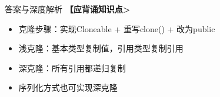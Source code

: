 \documentclass[12pt, a4paper]{ctexart}
\begin{document}
\begin{enumerate}[label=\textbf{\arabic*.}]
\begin{bluebox}{答案与深度解析}
		      \textbf{【应背诵知识点>}
		      \begin{itemize}[label={}, nosep]
			      \item 克隆步骤：实现Cloneable + 重写clone() + 改为public
			      \item 浅克隆：基本类型复制值，引用类型复制引用
			      \item 深克隆：所有引用都递归复制
			      \item 序列化方式也可实现深克隆
		      \end{itemize}
	      \end{bluebox}

\end{enumerate}
\end{document}
